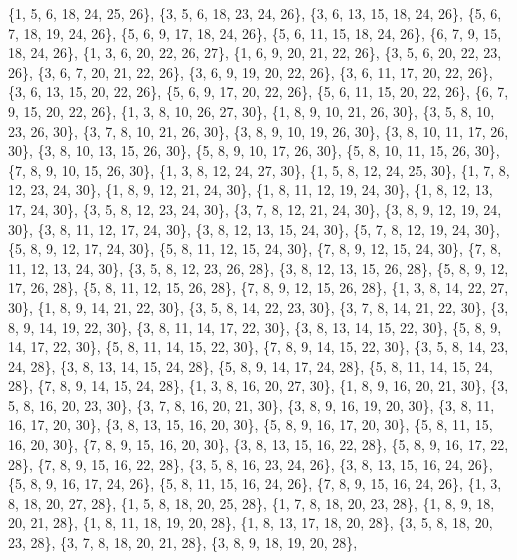 \documentclass[11pt,a4paper]{article}
\begin{document}
{\{1, 5, 6, 18, 24, 25, 26\}, \{3, 5, 6, 18, 23, 24, 26\}, \{3, 6, 13, 15, 18, 24, 26\}, \{5, 6, 7, 18, 19, 24, 26\}, \{5, 6, 9, 17, 18, 24, 26\},
\{5, 6, 11, 15, 18, 24, 26\}, \{6, 7, 9, 15, 18, 24, 26\}, \{1, 3, 6, 20, 22, 26, 27\}, \{1, 6, 9, 20, 21, 22, 26\}, \{3, 5, 6, 20, 22, 23, 26\},
\{3, 6, 7, 20, 21, 22, 26\}, \{3, 6, 9, 19, 20, 22, 26\}, \{3, 6, 11, 17, 20, 22, 26\}, \{3, 6, 13, 15, 20, 22, 26\}, \{5, 6, 9, 17, 20, 22, 26\},
\{5, 6, 11, 15, 20, 22, 26\}, \{6, 7, 9, 15, 20, 22, 26\}, \{1, 3, 8, 10, 26, 27, 30\}, \{1, 8, 9, 10, 21, 26, 30\}, \{3, 5, 8, 10, 23, 26, 30\},
\{3, 7, 8, 10, 21, 26, 30\}, \{3, 8, 9, 10, 19, 26, 30\}, \{3, 8, 10, 11, 17, 26, 30\}, \{3, 8, 10, 13, 15, 26, 30\}, \{5, 8, 9, 10, 17, 26, 30\},
\{5, 8, 10, 11, 15, 26, 30\}, \{7, 8, 9, 10, 15, 26, 30\}, \{1, 3, 8, 12, 24, 27, 30\}, \{1, 5, 8, 12, 24, 25, 30\}, \{1, 7, 8, 12, 23, 24, 30\},
\{1, 8, 9, 12, 21, 24, 30\}, \{1, 8, 11, 12, 19, 24, 30\}, \{1, 8, 12, 13, 17, 24, 30\}, \{3, 5, 8, 12, 23, 24, 30\}, \{3, 7, 8, 12, 21, 24, 30\},
\{3, 8, 9, 12, 19, 24, 30\}, \{3, 8, 11, 12, 17, 24, 30\}, \{3, 8, 12, 13, 15, 24, 30\}, \{5, 7, 8, 12, 19, 24, 30\}, \{5, 8, 9, 12, 17, 24, 30\},
\{5, 8, 11, 12, 15, 24, 30\}, \{7, 8, 9, 12, 15, 24, 30\}, \{7, 8, 11, 12, 13, 24, 30\}, \{3, 5, 8, 12, 23, 26, 28\}, \{3, 8, 12, 13, 15, 26, 28\},
\{5, 8, 9, 12, 17, 26, 28\}, \{5, 8, 11, 12, 15, 26, 28\}, \{7, 8, 9, 12, 15, 26, 28\}, \{1, 3, 8, 14, 22, 27, 30\}, \{1, 8, 9, 14, 21, 22, 30\},
\{3, 5, 8, 14, 22, 23, 30\}, \{3, 7, 8, 14, 21, 22, 30\}, \{3, 8, 9, 14, 19, 22, 30\}, \{3, 8, 11, 14, 17, 22, 30\}, \{3, 8, 13, 14, 15, 22, 30\},
\{5, 8, 9, 14, 17, 22, 30\}, \{5, 8, 11, 14, 15, 22, 30\}, \{7, 8, 9, 14, 15, 22, 30\}, \{3, 5, 8, 14, 23, 24, 28\}, \{3, 8, 13, 14, 15, 24, 28\},
\{5, 8, 9, 14, 17, 24, 28\}, \{5, 8, 11, 14, 15, 24, 28\}, \{7, 8, 9, 14, 15, 24, 28\}, \{1, 3, 8, 16, 20, 27, 30\}, \{1, 8, 9, 16, 20, 21, 30\},
\{3, 5, 8, 16, 20, 23, 30\}, \{3, 7, 8, 16, 20, 21, 30\}, \{3, 8, 9, 16, 19, 20, 30\}, \{3, 8, 11, 16, 17, 20, 30\}, \{3, 8, 13, 15, 16, 20, 30\},
\{5, 8, 9, 16, 17, 20, 30\}, \{5, 8, 11, 15, 16, 20, 30\}, \{7, 8, 9, 15, 16, 20, 30\}, \{3, 8, 13, 15, 16, 22, 28\}, \{5, 8, 9, 16, 17, 22, 28\},
\{7, 8, 9, 15, 16, 22, 28\}, \{3, 5, 8, 16, 23, 24, 26\}, \{3, 8, 13, 15, 16, 24, 26\}, \{5, 8, 9, 16, 17, 24, 26\}, \{5, 8, 11, 15, 16, 24, 26\},
\{7, 8, 9, 15, 16, 24, 26\}, \{1, 3, 8, 18, 20, 27, 28\}, \{1, 5, 8, 18, 20, 25, 28\}, \{1, 7, 8, 18, 20, 23, 28\}, \{1, 8, 9, 18, 20, 21, 28\},
\{1, 8, 11, 18, 19, 20, 28\}, \{1, 8, 13, 17, 18, 20, 28\}, \{3, 5, 8, 18, 20, 23, 28\}, \{3, 7, 8, 18, 20, 21, 28\}, \{3, 8, 9, 18, 19, 20, 28\},
}
\end{document}
